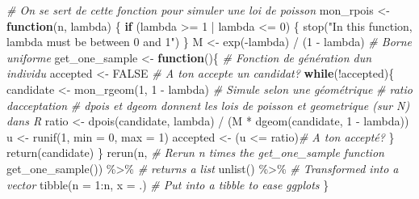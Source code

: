\documentclass[
]{article}
\newenvironment{Shaded}{\begin{snugshade}}{\end{snugshade}}
\newcommand{\AttributeTok}[1]{\textcolor[rgb]{0.77,0.63,0.00}{#1}}
\newcommand{\CommentTok}[1]{\textcolor[rgb]{0.56,0.35,0.01}{\textit{#1}}}
\newcommand{\ConstantTok}[1]{\textcolor[rgb]{0.00,0.00,0.00}{#1}}
\newcommand{\ControlFlowTok}[1]{\textcolor[rgb]{0.13,0.29,0.53}{\textbf{#1}}}
\newcommand{\DecValTok}[1]{\textcolor[rgb]{0.00,0.00,0.81}{#1}}
\newcommand{\FunctionTok}[1]{\textcolor[rgb]{0.00,0.00,0.00}{#1}}
\newcommand{\NormalTok}[1]{#1}
\newcommand{\OtherTok}[1]{\textcolor[rgb]{0.56,0.35,0.01}{#1}}
\newcommand{\SpecialCharTok}[1]{\textcolor[rgb]{0.00,0.00,0.00}{#1}}
\newcommand{\StringTok}[1]{\textcolor[rgb]{0.31,0.60,0.02}{#1}}
\begin{document}
\begin{Shaded}
\begin{Highlighting}[]
\CommentTok{\# On se sert de cette fonction pour simuler une loi de poisson}
\NormalTok{mon\_rpois }\OtherTok{\textless{}{-}} \ControlFlowTok{function}\NormalTok{(n, lambda) \{}
  \ControlFlowTok{if}\NormalTok{ (lambda }\SpecialCharTok{\textgreater{}=} \DecValTok{1} \SpecialCharTok{|}\NormalTok{ lambda }\SpecialCharTok{\textless{}=} \DecValTok{0}\NormalTok{) \{}
    \FunctionTok{stop}\NormalTok{(}\StringTok{"In this function, lambda must be between 0 and 1"}\NormalTok{)}
\NormalTok{  \}}
\NormalTok{  M }\OtherTok{\textless{}{-}} \FunctionTok{exp}\NormalTok{(}\SpecialCharTok{{-}}\NormalTok{lambda) }\SpecialCharTok{/}\NormalTok{ (}\DecValTok{1} \SpecialCharTok{{-}}\NormalTok{ lambda) }\CommentTok{\# Borne uniforme}
\NormalTok{  get\_one\_sample }\OtherTok{\textless{}{-}} \ControlFlowTok{function}\NormalTok{()\{ }\CommentTok{\# Fonction de génération d\textquotesingle{}un individu}
\NormalTok{    accepted }\OtherTok{\textless{}{-}} \ConstantTok{FALSE} \CommentTok{\# A t\textquotesingle{}on accepte un candidat?}
    \ControlFlowTok{while}\NormalTok{(}\SpecialCharTok{!}\NormalTok{accepted)\{}
\NormalTok{      candidate }\OtherTok{\textless{}{-}} \FunctionTok{mon\_rgeom}\NormalTok{(}\DecValTok{1}\NormalTok{, }\DecValTok{1} \SpecialCharTok{{-}}\NormalTok{ lambda) }\CommentTok{\# Simule selon une géométrique}
      \CommentTok{\# ratio d\textquotesingle{}acceptation}
      \CommentTok{\# dpois et dgeom donnent les lois de poisson et geometrique (sur N) dans R}
\NormalTok{      ratio }\OtherTok{\textless{}{-}} \FunctionTok{dpois}\NormalTok{(candidate, lambda) }\SpecialCharTok{/}\NormalTok{ (M }\SpecialCharTok{*} \FunctionTok{dgeom}\NormalTok{(candidate, }\DecValTok{1} \SpecialCharTok{{-}}\NormalTok{ lambda))}
\NormalTok{      u }\OtherTok{\textless{}{-}} \FunctionTok{runif}\NormalTok{(}\DecValTok{1}\NormalTok{, }\AttributeTok{min =} \DecValTok{0}\NormalTok{, }\AttributeTok{max =} \DecValTok{1}\NormalTok{)}
\NormalTok{      accepted }\OtherTok{\textless{}{-}}\NormalTok{ (u }\SpecialCharTok{\textless{}=}\NormalTok{ ratio)}\CommentTok{\# A t\textquotesingle{}on accepté?}
\NormalTok{    \}}
    \FunctionTok{return}\NormalTok{(candidate)}
\NormalTok{  \}}
  \FunctionTok{rerun}\NormalTok{(n, }\CommentTok{\# Rerun n times the get\_one\_sample function}
               \FunctionTok{get\_one\_sample}\NormalTok{()) }\SpecialCharTok{\%\textgreater{}\%} \CommentTok{\# returns a list}
    \FunctionTok{unlist}\NormalTok{() }\SpecialCharTok{\%\textgreater{}\%} \CommentTok{\# Transformed into a vector}
    \FunctionTok{tibble}\NormalTok{(}\AttributeTok{n =} \DecValTok{1}\SpecialCharTok{:}\NormalTok{n, }\AttributeTok{x =}\NormalTok{ .) }\CommentTok{\# Put into a tibble to ease ggplots}
\NormalTok{\}}
\end{Highlighting}
\end{Shaded}
\end{document}
